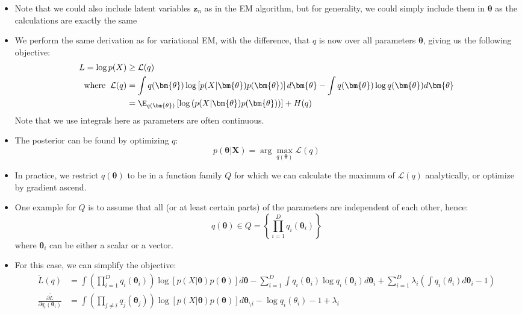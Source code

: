 \begin{itemize}
\begin{figure}[ht!]
{			;
		}
	\end{figure}
	\item Note that we could also include latent variables $\bm{z}_n$ as in the EM algorithm, but for generality, we could simply include them in $\bm{\theta}$ as the calculations are exactly the same
	\item We perform the same derivation as for variational EM, with the difference, that $q$ is now over all parameters $\bm{\theta}$, giving us the following objective:
	\begin{equation*}
		\begin{split}
			L=\log p(X) & \geq \mathcal{L}(q)\\
			\text{where}\hspace{2mm}\mathcal{L}(q) & = \int q(\bm{\theta}) \log \left[p(X|\bm{\theta})p(\bm{\theta})\right]d\bm{\theta} - \int q(\bm{\theta})\log q(\bm{\theta})d\bm{\theta}\\
			& = \E_{q(\bm{\theta})}\left[\log \left(p(X|\bm{\theta})p(\bm{\theta})\right)\right] + H(q)
		\end{split}
	\end{equation*}
	Note that we use integrals here as parameters are often continuous.
	\item The posterior can be found by optimizing $q$:
	$$p(\bm{\theta}|\bm{X}) = \arg\max_{q(\bm{\theta})} \mathcal{L}(q)$$
	\item In practice, we restrict $q(\bm{\theta})$ to be in a function family $Q$ for  which we can calculate the maximum of $\mathcal{L}(q)$ analytically, or optimize by gradient ascend. 
	\item One example for $Q$ is to assume that all (or at least certain parts) of the parameters are independent of each other, hence:
	$$q(\bm{\theta})\in Q=\left\{\prod_{i=1}^{D}q_i(\bm{\theta}_i)\right\}$$
	where $\bm{\theta}_i$ can be either a scalar or a vector.
	\item For this case, we can simplify the objective:
	\begin{equation*}
		\begin{split}
			\tilde{L}(q) & = \int \left(\prod_{i=1}^{D} q_i(\bm{\theta}_i)\right) \log \left[p(X|\bm{\theta})p(\bm{\theta})\right]d\bm{\theta} - \sum_{i=1}^{D}\int q_i(\bm{\theta}_i)\log q_i(\bm{\theta}_i)d\bm{\theta}_i + \sum_{i=1}^{D} \lambda_i \left(\int q_i(\theta_i)d\bm{\theta}_i - 1\right)\\
			\frac{\partial \tilde{L}}{\partial q_i(\bm{\theta}_i)} & = \int \left(\prod_{j\neq i} q_j(\bm{\theta}_j)\right) \log \left[p(X|\bm{\theta})p(\bm{\theta})\right]d\bm{\theta}_{\setminus i} - \log q_i(\theta_i) - 1 + \lambda_i\\

\end{split}
\end{equation*}
\end{itemize}
